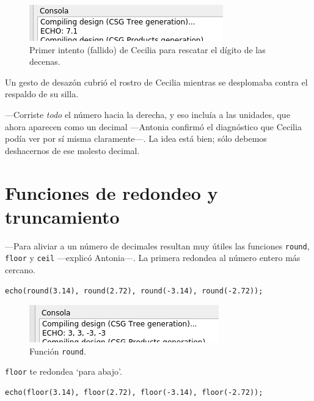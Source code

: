 \begin{figure}[ht]
  \centering
\includegraphics[width=.75\textwidth]{imagenes/resto-decenas-1}  
\caption{Primer intento (fallido) de Cecilia para rescatar el dígito
  de las decenas.}
  \label{fig:resto-decenas-1}
\end{figure}


Un gesto de desazón cubrió el rostro de Cecilia mientras se
desplomaba contra el respaldo de su silla.

---Corriste \emph{todo} el número hacia la derecha, y eso incluía a
las unidades, que ahora aparecen como un decimal ---Antonia confirmó
el diagnóstico que Cecilia podía ver por sí misma claramente---. La
idea está bien; sólo debemos deshacernos de ese molesto decimal.

\section{Funciones de redondeo y truncamiento}

---Para aliviar a un número de decimales resultan muy útiles las
  funciones \lstinline!round!, \lstinline!floor! y
  \lstinline!ceil! ---explicó Antonia---. La primera
  redondea al número entero más cercano.

\begin{lstlisting}[numbers=none]
echo(round(3.14), round(2.72), round(-3.14), round(-2.72));
\end{lstlisting}

\begin{figure}[ht]
  \centering
\includegraphics[width=.75\textwidth]{imagenes/round}  
  \caption{Función \lstinline!round!.}
  \label{fig:round}
\end{figure}


\guillemotright \lstinline!floor! te redondea `para abajo'.

\begin{lstlisting}[numbers=none]
echo(floor(3.14), floor(2.72), floor(-3.14), floor(-2.72));
\end{lstlisting}

